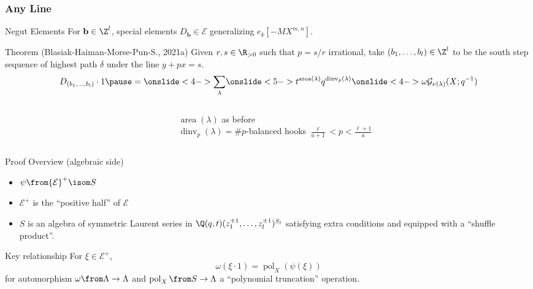 \documentclass{beamer}
\newcommand{\sym}{\Lambda}
\DeclareMathOperator{\area}{area}
\DeclareMathOperator{\dinv}{dinv}
\newcommand{\Gcal}{\mathcal{G}}
\newcommand{\Ecal}{{\mathcal E}}
\newcommand{\bb}{{\mathbf b}}
\DeclareMathOperator{\pol}{pol}
\newcounter{c}
\begin{document}
\begin{frame}
  \frametitle{Any Line}
  \begin{block}{Negut Elements}
    For \(\bb \in \Z^l\), special elements \(D_\bb \in
    \Ecal\) generalizing \(e_k[-MX^{m,n}]\).
  \end{block}
  \pause
  \begin{block}{Theorem (Blasiak-Haiman-Morse-Pun-S., 2021a)}
    Given \(r,s \in \R_{>0}\) such that \(p = s/r\) irrational, take
    \((b_1,\ldots,b_l) \in \Z^l\) to be the south step sequence of highest path
    \(\delta\) under the line \(y+px=s\).
    \pause \[
      D_{(b_1,\ldots,b_l)} \cdot 1 \pause =
      \onslide<4->{\sum_{\lambda}}\onslide<5->
      {
        t^{\area(\lambda)}
        q^{\dinv_p(\lambda)}}\onslide<4->{\omega \Gcal_{\nu(\lambda)}(X;q^{-1})}
    \]
  \end{block}\pause
  \begin{columns}
    \begin{column}{0.2\textwidth}
    \end{column}
    \begin{column}{0.8\textwidth}
      \(\area(\lambda)\) as before\\
      \(\dinv_p(\lambda) = \# p\)-balanced hooks \(\frac{\ell}{a+1} < p <
      \frac{\ell+1}{a}\)\\
    \end{column}
  \end{columns}
\end{frame}
\begin{frame}{Proof Overview (algebraic side)}
  \begin{itemize}
  \item \(\psi \from \Ecal^+ \isom S\)
  \item \(\Ecal^+\) is the ``positive half'' of \(\Ecal\)
  \item \(S\) is an algebra of symmetric Laurent series in
    \(\Q(q,t)(z_1^{\pm 1},\ldots, z_l^{\pm 1})^{S_l}\) satisfying
    extra conditions and equipped with a ``shuffle product''.\pause
  \end{itemize}
  \begin{block}{Key relationship}
    For \(\xi \in \Ecal^+\),
    \[
      \omega(\xi \cdot 1) = \pol_X(\psi(\xi)) 
    \]
    for automorphism \(\omega \from \sym \to \sym\) and \(\pol_X \from
    S \to \sym\) a ``polynomial truncation'' operation.
  \end{block}
\end{frame}
\end{document}

